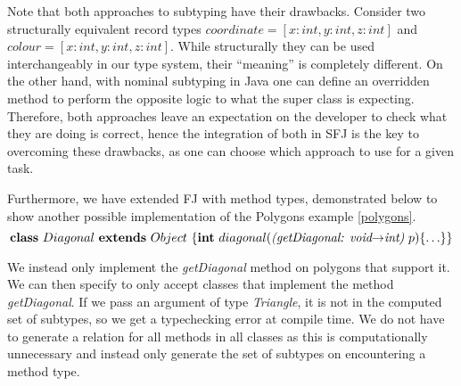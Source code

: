 \documentclass[runningheads]{llncs}
\begin{document}
Note that both approaches to subtyping have their drawbacks.
Consider two structurally equivalent record types $coordinate = [x:int, y:int, z:int]$ and $colour = [x:int, y:int, z:int]$. 
While structurally they can be used interchangeably in our type system, their ``meaning'' is completely different.
On the other hand, with nominal subtyping in Java one can define an overridden method to perform the opposite logic to what the super class is expecting. 
Therefore, both approaches leave an expectation on the developer to check what they are doing is correct, hence the integration of both in SFJ is the key to overcoming these drawbacks, as one can choose which approach to use for a given task.

Furthermore, we have extended FJ with method types, demonstrated below to show another possible implementation of the Polygons example \autoref{polygons}.
$$
\mathbf{class} \  Diagonal \ \mathbf{extends }\  Object\ \{
	\mathbf{int}\ diagonal(\textit{(getDiagonal: void$\rightarrow$int)}  \ p)\{\ldots\}
\}
$$

We instead only implement the \emph{getDiagonal} method on polygons that support it. We can then specify to only accept classes that implement the method \emph{getDiagonal}. If we pass an argument of type \emph{Triangle}, it is not in the computed set of subtypes, so we get a typechecking error at compile time.
We do not have to generate a relation for all methods in all classes as this is computationally unnecessary and instead
only generate the set of subtypes on encountering a method type.

\end{document}
